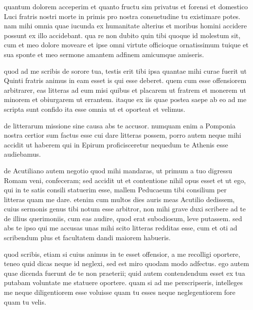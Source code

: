 


 quantum dolorem acceperim et quanto fructu sim privatus et forensi et domestico Luci fratris nostri morte in primis pro nostra consuetudine tu existimare potes. nam mihi omnia quae iucunda ex humanitate alterius et moribus homini accidere possunt ex illo accidebant. qua re non dubito quin tibi quoque id molestum sit, cum et meo dolore moveare et ipse omni virtute officioque ornatissimum tuique et sua sponte et meo sermone amantem adfinem amicumque amiseris.

 quod ad me scribis de sorore tua, testis erit tibi ipsa quantae mihi curae fuerit ut Quinti fratris animus in eam esset is qui esse deberet. quem cum esse offensiorem arbitrarer, eas litteras ad eum misi quibus et placarem ut fratrem et monerem ut minorem et obiurgarem ut errantem. itaque ex iis quae postea saepe ab eo ad me scripta sunt confido ita esse omnia ut et oporteat et velimus.

 de litterarum missione sine causa abs te accusor. numquam enim a Pomponia nostra certior sum factus esse cui dare litteras possem, porro autem neque mihi accidit ut haberem qui in Epirum proficisceretur nequedum te Athenis esse audiebamus.

 de Acutiliano autem negotio quod mihi mandaras, ut primum a tuo digressu Romam veni, confeceram; sed accidit ut et contentione nihil opus esset et ut ego, qui in te satis consili statuerim esse, mallem Peducaeum tibi consilium per litteras quam me dare. etenim cum multos dies auris meas Acutilio dedissem, cuius sermonis genus tibi notum esse arbitror, non mihi grave duxi scribere ad te de illius querimoniis, cum eas audire, quod erat subodiosum, leve putassem. sed abs te ipso qui me accusas unas mihi scito litteras redditas esse, cum et oti ad scribendum plus et facultatem dandi maiorem habueris.

 quod scribis, etiam si cuius animus in te esset offensior, a me recolligi oportere, teneo quid dicas neque id neglexi, sed est miro quodam modo adfectus. ego autem quae dicenda fuerunt de te non praeterii; quid autem contendendum esset ex tua putabam voluntate me statuere oportere. quam si ad me perscripseris, intelleges me neque diligentiorem esse voluisse quam tu esses neque neglegentiorem fore quam tu velis.

